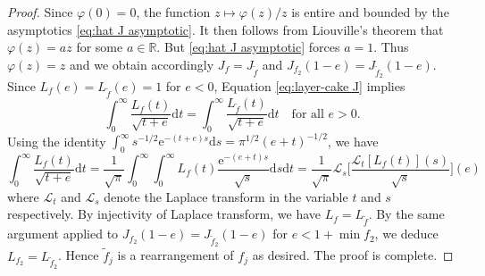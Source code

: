 \documentclass[10pt,a4paper]{amsart}
\newcommand{\R}{\mathbb{R}}
\newcommand{\dif}{\mathrm{d}}
\newcommand{\eu}{\mathrm{e}}
\newcommand{\wt}{\widetilde}
\begin{document}
\begin{proof}
\medskip

	Since $\varphi(0) = 0$, the function $z \mapsto \varphi(z) /z$ is entire and bounded by the asymptotics \eqref{eq:hat J asymptotic}.
	It then follows from Liouville's theorem that $\varphi(z) = az$ for some $a \in \R$.
	But \eqref{eq:hat J asymptotic} forces $a = 1$. Thus $\varphi(z) = z$ and we obtain accordingly $J_f = J_{\wt f}$ and $J_{f_2}(1 - e) = J_{\wt f_2}(1 - e)$. Since $L_f(e) = L_{\wt f}(e) = 1$ for $e < 0$, Equation \eqref{eq:layer-cake J} implies 
	\begin{equation*}		\int_{0}^\infty \frac{L_f(t)}{\sqrt{t + e}} \dif t = \int_{0}^\infty \frac{L_{\wt f}(t)}{\sqrt{t + e}} \dif t \quad \text{for all $e > 0$}.
	\end{equation*}
	Using the identity $\int_0^\infty s^{-1/2}\eu^{-(t + e) s} \dif s = \pi^{1/2} (e + t)^{-1/2}$, we have 
	\begin{equation*}
		\int_{0}^\infty \frac{L_f(t)}{\sqrt{t + e}} \dif t = \frac{1}{\sqrt{\pi}} \int_{0}^\infty \int_0^\infty  L_f(t) \frac{\eu^{-(e + t)s}}{\sqrt{s}} \dif s \dif t = \frac{1}{\sqrt{\pi}} \mathscr{L}_s \bigg[  \frac{\mathscr{L}_t[L_f(t)](s)}{\sqrt{s}}\bigg](e)
	\end{equation*}
	where $\mathscr{L}_t$  and  $\mathscr{L}_s$  denote the Laplace transform in the variable $t$ and $s$ respectively.
	By injectivity of Laplace transform, we have $L_f = L_{\wt f}$.
	By the same argument applied to $J_{f_2}(1 - e) = J_{\wt f_2}(1 - e)$ for $e < 1 + \min f_2$, we deduce $L_{f_2} = L_{\wt f_2}$. 
	Hence $\wt f_j$ is a rearrangement of $f_j$ as desired. 
	The proof is complete.
\end{proof}
\end{document}
